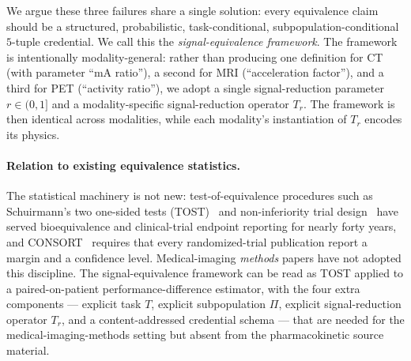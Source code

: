 \documentclass[twoside,11pt]{article}
\begin{document}
We argue these three failures share a single solution: every equivalence claim should be a structured, probabilistic, task-conditional, subpopulation-conditional $5$-tuple credential. We call this the \emph{signal-equivalence framework}. The framework is intentionally modality-general: rather than producing one definition for CT (with parameter ``mA ratio''), a second for MRI (``acceleration factor''), and a third for PET (``activity ratio''), we adopt a single signal-reduction parameter $r \in (0,1]$ and a modality-specific signal-reduction operator $T_r$. The framework is then identical across modalities, while each modality's instantiation of $T_r$ encodes its physics.

\paragraph{Relation to existing equivalence statistics.} The statistical machinery is not new: test-of-equivalence procedures such as Schuirmann's two one-sided tests (TOST)~\citep{schuirmann1987tost} and non-inferiority trial design~\citep{piaggio2012ni} have served bioequivalence and clinical-trial endpoint reporting for nearly forty years, and CONSORT~\citep{schulz2010consort} requires that every randomized-trial publication report a margin and a confidence level. Medical-imaging \textit{methods} papers have not adopted this discipline. The signal-equivalence framework can be read as TOST applied to a paired-on-patient performance-difference estimator, with the four extra components --- explicit task $T$, explicit subpopulation $\Pi$, explicit signal-reduction operator $T_r$, and a content-addressed credential schema --- that are needed for the medical-imaging-methods setting but absent from the pharmacokinetic source material.
\end{document}
